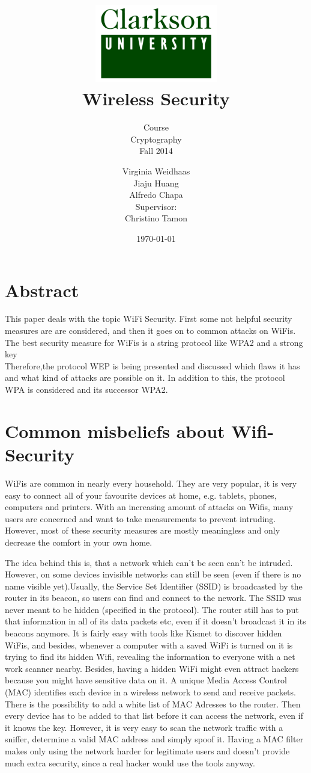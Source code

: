 \documentclass[a4paper,12pt,pagesize,headsepline,bibtotoc,titlepage]{scrartcl}
\title{
	\includegraphics*[width=0.4\textwidth]{clarkson.png}\\
	\vspace{24pt}
	Wireless Security
}
\subtitle{
	Course\\
	Cryptography\\
	Fall 2014
}
\author{
	Virginia Weidhaas\\[12pt]
    Jiaju Huang\\[12pt]
	Alfredo Chapa\\[12pt]	
	Supervisor:\\
	Christino Tamon
}
\date{\today}
\begin{document}
\maketitle
\tableofcontents
\newpage
\section{Abstract}
This paper deals with the topic WiFi Security. First some not helpful security measures are are considered, and then it goes on to common attacks on WiFis.\\
The best security measure for WiFis is a string protocol like WPA2 and a strong key\\
Therefore,the protocol WEP is being presented and discussed which flaws it has and what kind of attacks are possible on it.
In addition to this, the protocol WPA is considered and its successor WPA2.
\newpage



\section{Common misbeliefs about Wifi-Security}

WiFis are common in nearly every household. They are very popular, it is very easy to connect all of your favourite devices at home, e.g. tablets, phones, computers and printers.
With an increasing amount of attacks on Wifis, many users are concerned and want to take measurements to prevent intruding.
However, most of these security measures are mostly meaningless and only decrease the comfort in your own home.

The idea behind this is, that a network which can't be seen can't be intruded.
However, on  some devices invisible networks can still be seen (even if there is no name visible yet).Usually, the Service Set Identifier (SSID) is broadcasted by the router in its beacon, so users can find and connect to the nework.
The SSID was never meant to be hidden (specified in the protocol).
The router still has to put that information in all of its data packets etc, even if it doesn't broadcast it in its beacons anymore.
It is fairly easy with tools like Kismet to discover hidden WiFis, and besides, whenever a computer with a saved WiFi is turned on it is trying to find its hidden Wifi, revealing the information to everyone with a net work scanner nearby. 
Besides, having a hidden WiFi might even attract hackers because you might have sensitive data on it.
A unique Media Access Control (MAC) identifies each device in a wireless network to send and receive packets.
There is the possibility to add a white list of MAC Adresses to the router. Then every device has to be added to that list before it can access the network, even if it knows the key.
However, it is very easy to scan the network traffic with a sniffer, determine a valid MAC address and simply spoof it.
Having a MAC filter makes only using the network harder for legitimate users and doesn't provide much extra security, since a real hacker would use the tools anyway.
\end{document}
